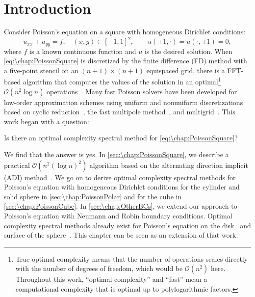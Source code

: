 \section{Introduction}\label{sec:\chap:introduction}
Consider Poisson's equation on a square with homogeneous Dirichlet conditions:
\begin{equation}
u_{xx} + u_{yy} = f, \quad (x,y)\in [-1,1]^2,\qquad u(\pm1,\cdot) = u(\cdot,\pm 1) = 0,
\label{eq:\chap:PoissonSquare}
\end{equation}
where $f$ is a known continuous function and $u$ is the desired solution.
When \cref{eq:\chap:PoissonSquare} is discretized by the finite difference (FD) method with a five-point stencil on an $(n+1)\times (n+1)$ equispaced grid, there is a FFT-based algorithm that computes the values of the solution in an optimal\footnote{True optimal complexity means that the number of operations scales directly with the number of degrees of freedom, which would be $\mathcal{O}(n^2)$ here. Throughout this work, ``optimal complexity'' and ``fast'' mean a computational complexity that is optimal up to polylogarithmic factors.} $\mathcal{O}(n^2 \log n)$ operations~\cite{Henrici_79_01}. Many fast Poisson solvers have been developed for low-order approximation schemes using uniform and nonuniform discretizations based on cyclic reduction~\cite{Buzbee_70_01}, the fast multipole method~\cite{McKenney_95_01}, and multigrid~\cite{Gholami_16_01}. This work began with a question:
\begin{quoting}
\centering Is there an optimal complexity spectral method for \cref{eq:\chap:PoissonSquare}?
\end{quoting}
We find that the answer is yes. In \cref{sec:\chap:PoissonSquare}, we describe a practical $\mathcal{O}(n^2(\log n)^2)$ algorithm based on the alternating direction implicit (ADI) method~\cite{Peaceman_55_01}. We go on to derive optimal complexity spectral methods for Poisson's equation with homogeneous Dirichlet conditions for the cylinder and solid sphere in \cref{sec:\chap:PoissonPolar} and for the cube in \cref{sec:\chap:PoissonCube}. In \cref{sec:\chap:OtherBCs}, we extend our approach to Poisson's equation with Neumann and Robin boundary conditions. Optimal complexity spectral methods already exist for Poisson's equation on the disk~\cite{Wilber_16_01, Wilber_17_01} and surface of the sphere~\cite{Townsend_16_01}. This chapter can be seen as an extension of that work. 

